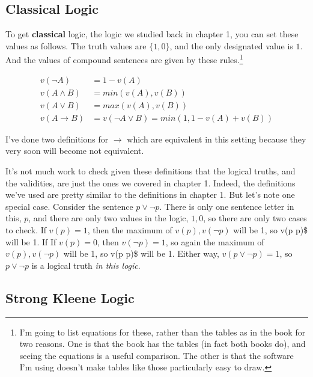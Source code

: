\documentclass[
]{article}
\begin{document}
\hypertarget{classical-logic}{%
\subsection{Classical Logic}\label{classical-logic}}

To get \textbf{classical} logic, the logic we studied back in chapter 1,
you can set these values as follows. The truth values are \(\{1,0\}\),
and the only designated value is \(1\). And the values of compound
sentences are given by these rules.\footnote{I'm going to list equations
  for these, rather than the tables as in the book for two reasons. One
  is that the book has the tables (in fact both books do), and seeing
  the equations is a useful comparison. The other is that the software
  I'm using doesn't make tables like those particularly easy to draw.}

\begin{align*}
v(\neg A) &= 1 - v(A) \\
v(A \wedge B) &= min(v(A), v(B)) \\
v(A \vee B) &= max(v(A), v(B)) \\
v(A \rightarrow B) &= v(\neg A \vee B) = min(1, 1 - v(A) + v(B)) 
\end{align*}

I've done two definitions for \(\rightarrow\) which are equivalent in
this setting because they very soon will become not equivalent.

It's not much work to check given these definitions that the logical
truths, and the validities, are just the ones we covered in chapter 1.
Indeed, the definitions we've used are pretty similar to the definitions
in chapter 1. But let's note one special case. Consider the sentence
\(p \vee \neg p\). There is only one sentence letter in this, \(p\), and
there are only two values in the logic, \(1, 0\), so there are only two
cases to check. If \(v(p) = 1\), then the maximum of \(v(p), v(\neg p)\)
will be 1, so v(p \vee \neg p)\$ will be 1. If If \(v(p) = 0\), then
\(v(\neg p) = 1\), so again the maximum of \(v(p), v(\neg p)\) will be
1, so v(p \vee \neg p)\$ will be 1. Either way,
\(v(p \vee \neg p) = 1\), so \(p \vee \neg p\) is a logical truth
\emph{in this logic}.

\hypertarget{strong-kleene-logic}{%
\subsection{Strong Kleene Logic}\label{strong-kleene-logic}}
\end{document}
